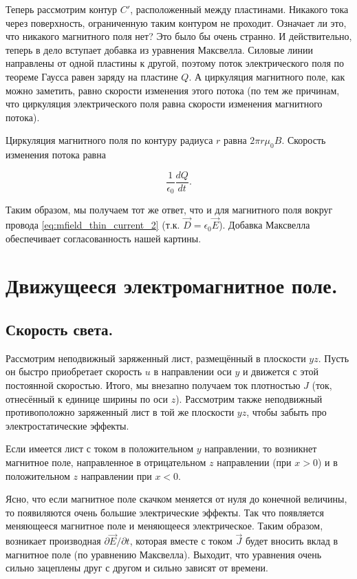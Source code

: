 \documentclass[11pt,a4paper]{article}
\numberwithin{equation}{section}
\newcommand{\pt}{\partial}
\newcommand{\eps}{\epsilon}
\begin{document}
Теперь рассмотрим контур $C'$, расположенный между пластинами. Никакого
тока через поверхность, ограниченную таким контуром не
проходит. Означает ли это, что никакого магнитного поля нет? Это было
бы очень странно. И действительно, теперь в дело вступает добавка из
уравнения Максвелла. Силовые линии направлены от одной пластины к
другой, поэтому поток электрического поля по теореме Гаусса равен
заряду на пластине $Q$. А циркуляция магнитного поле, как можно
заметить, равно скорости изменения этого потока (по тем же причинам,
что циркуляция электрического поля равна скорости изменения магнитного
потока). 

Циркуляция магнитного поля по контуру радиуса $r$ равна $2\pi r
\mu_0 B$. Скорость изменения потока равна 

\begin{equation}
  \label{eq:phys_sense_maxwell_1}
  \frac{1}{\eps_0} \frac{dQ}{dt}.
\end{equation}

Таким образом, мы получаем тот же ответ, что и для магнитного поля
вокруг провода \eqref{eq:mfield_thin_current_2} (т.к. $\vec{D} =
\eps_0 \vec{E}$). Добавка Максвелла обеспечивает согласованность нашей
картины.

\section{Движущееся электромагнитное поле. }
\label{sec:moving_plate}

\subsection{Скорость света.}
\label{sec:speed_of_light}

Рассмотрим неподвижный заряженный лист, размещённый в плоскости
$yz$. Пусть он быстро приобретает скорость $u$ в направлении оси $y$ и
движется с этой постоянной скоростью. Итого, мы внезапно получаем ток
плотностью $J$ (ток, отнесённый к единице ширины по оси
$z$). Рассмотрим также неподвижный противоположно заряженный лист в
той же плоскости $yz$, чтобы забыть про электростатические эффекты.

Если имеется лист с током в положительном $y$ направлении, то
возникнет магнитное поле, направленное в отрицательном $z$
направлении (при $x>0$) и в положительном $z$ направлении при $x<0$. 

Ясно, что если магнитное поле скачком меняется от нуля до конечной
величины, то появиляются очень большие электрические эффекты. Так что
появляется меняющееся магнитное поле и меняющееся электрическое. Таким
образом, возникает производная $\pt \vec{E} / \pt t$, которая вместе с
током $\vec{J}$ будет вносить вклад в магнитное поле (по уравнению
Максвелла). Выходит, что уравнения очень сильно зацеплены друг с
другом и сильно зависят от времени. 
\end{document}
